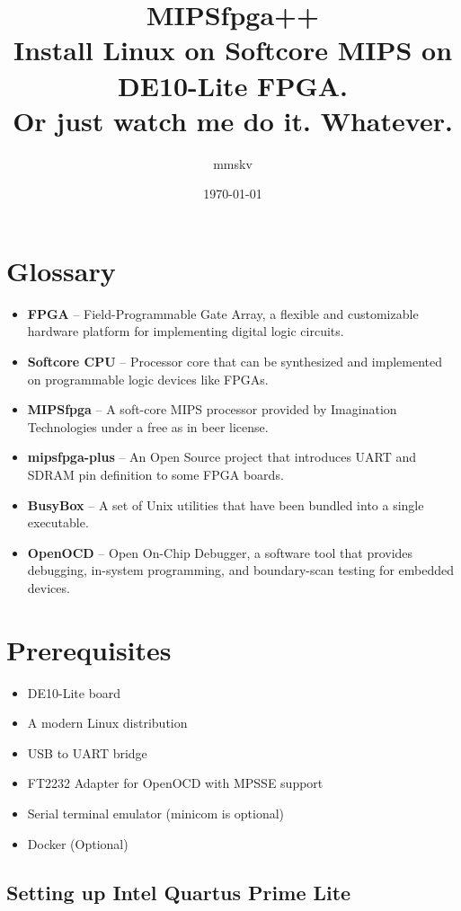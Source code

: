 \documentclass[a4paper]{article}
\date{\today}
\title{MIPSfpga++ \\ Install Linux on Softcore MIPS on DE10-Lite FPGA. \\ Or just watch me do it. Whatever.}
\author{mmskv}
\date{}
\begin{document}
\maketitle
\tableofcontents

\pagebreak


\section{Glossary}
\begin{itemize}
    \itemsep0em
    \item \textbf{FPGA} -- Field-Programmable Gate Array, a flexible and customizable hardware platform for implementing digital logic circuits.
    \item \textbf{Softcore CPU} -- Processor core that can be synthesized and implemented on programmable logic devices like FPGAs.
    \item \textbf{MIPSfpga} -- A soft-core MIPS processor provided by Imagination Technologies under a free as in beer license.
    \item \textbf{mipsfpga-plus} -- An Open Source project that introduces UART and SDRAM pin definition to some FPGA boards.
    \item \textbf{BusyBox} -- A set of Unix utilities that have been bundled into a single executable.
    \item \textbf{OpenOCD} -- Open On-Chip Debugger, a software tool that provides debugging, in-system programming, and boundary-scan testing for embedded devices.
\end{itemize}

\section{Prerequisites}
\begin{itemize}
    \itemsep0em
    \item DE10-Lite board
    \item A modern Linux distribution
    \item USB to UART bridge
    \item FT2232 Adapter for OpenOCD with MPSSE support
    \item Serial terminal emulator (minicom is optional)
    \item Docker (Optional)
\end{itemize}

\subsection{Setting up Intel Quartus Prime Lite}
\end{document}
